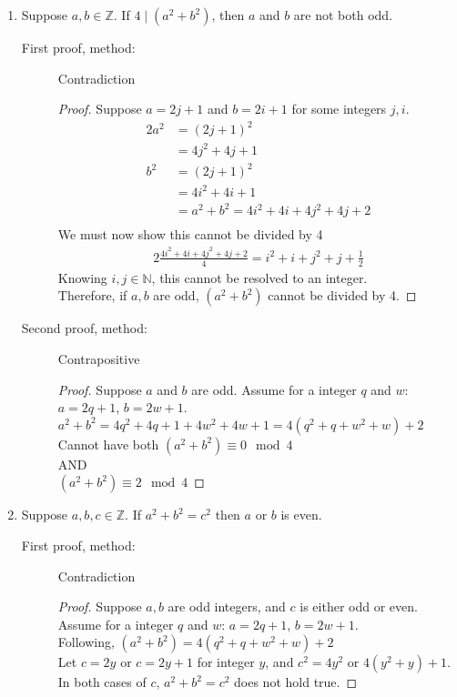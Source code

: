 \documentclass{article}
\begin{document}
\begin{enumerate}
\begin{description}
\begin{proof}
    
    	Therefore, $a$ is odd.
    \end{proof}
  \end{description}

\item Suppose $a,b\in\mathbb{Z}$.  If $4\mid (a^2+b^2)$, then $a$ and
  $b$ are not both odd.
  \begin{description}
    \item[First proof, method:] Contradiction
    \begin{proof} Suppose $a=2j+1$ and $b=2i+1$ for some integers $j,i$. \\
    \begin{alignat*}{2}
    a^2 &= (2j+1)^2 \\
    &= 4j^2+4j+1 \\
    b^2 &= (2j+1)^2 \\
    &= 4i^2+4i+1 \\
    &= a^2+b^2=4i^2+4i+4j^2+4j+2 \\
    \end{alignat*}
    We must now show this cannot be divided by 4
    \begin{alignat*}{2}
    \frac{4i^2+4i+4j^2+4j+2}{4} 
    = i^2 + i+j^2+j+\frac{1}{2}
    \end{alignat*}
    Knowing $i,j\in\mathbb{N}$, this cannot be resolved to an integer. \\
    Therefore, if $a,b$ are odd, $(a^2+b^2)$ cannot be divided by 4.
    
    \end{proof}
    \item[Second proof, method:] Contrapositive
    \begin{proof}
    Suppose $a$ and $b$ are odd. Assume for a integer $q$ and $w$: $a=2q+1$, $b=2w+1$. \\
    $a^2+b^2=4q^2+4q+1+4w^2+4w+1=4(q^2+q+w^2+w)+2$ \\ 
    Cannot have both $(a^2+b^2) \equiv 0 \mod 4$ \\ AND  \\$(a^2+b^2) \equiv 2 \mod 4$
    \end{proof}
  \end{description}

\item Suppose $a,b,c\in\mathbb{Z}$.  If $a^2+b^2=c^2$ then $a$ or
  $b$ is even.
  \begin{description}
    \item[First proof, method:] Contradiction
    \begin{proof}
    Suppose $a,b$ are odd integers, and $c$ is either odd or even. Assume for a integer $q$ and $w$: $a=2q+1$, $b=2w+1$.\\ Following, $(a^2+b^2)=4(q^2+q+w^2+w)+2$ \\
    Let $c=2y$ or $c=2y+1$ for integer $y$, and $c^2=4y^2$ or $4(y^2+y)+1$. \\
    In both cases of $c$, $a^2+b^2=c^2$ does not hold true.
    

\end{proof}
\end{description}
\end{enumerate}
\end{document}
